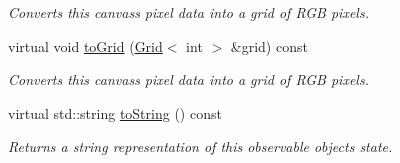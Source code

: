 \begin{DoxyCompactItemize}
\begin{DoxyCompactList}\small\item\em Converts this canvas\textquotesingle{}s pixel data into a grid of R\+GB pixels. \end{DoxyCompactList}\item 
virtual void \mbox{\hyperlink{classGCanvas_a11c06bec679dda1519ed914bca68900a}{to\+Grid}} (\mbox{\hyperlink{classGrid}{Grid}}$<$ int $>$ \&grid) const
\begin{DoxyCompactList}\small\item\em Converts this canvas\textquotesingle{}s pixel data into a grid of R\+GB pixels. \end{DoxyCompactList}\item 
virtual std\+::string \mbox{\hyperlink{classGObservable_a1fe5121d6528fdea3f243321b3fa3a49}{to\+String}} () const
\begin{DoxyCompactList}\small\item\em Returns a string representation of this observable object\textquotesingle{}s state. \end{DoxyCompactList}\end{DoxyCompactItemize}
